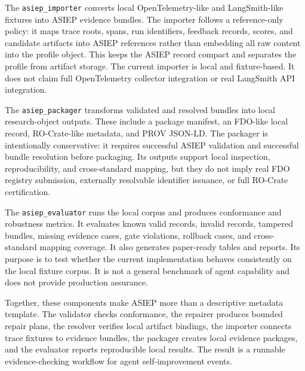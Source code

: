The \texttt{asiep\_importer} converts local OpenTelemetry-like and LangSmith-like fixtures into ASIEP evidence bundles. The importer follows a reference-only policy: it maps trace roots, spans, run identifiers, feedback records, scores, and candidate artifacts into ASIEP references rather than embedding all raw content into the profile object. This keeps the ASIEP record compact and separates the profile from artifact storage. The current importer is local and fixture-based. It does not claim full OpenTelemetry collector integration or real LangSmith API integration.

The \texttt{asiep\_packager} transforms validated and resolved bundles into local research-object outputs. These include a package manifest, an FDO-like local record, RO-Crate-like metadata, and PROV JSON-LD. The packager is intentionally conservative: it requires successful ASIEP validation and successful bundle resolution before packaging. Its outputs support local inspection, reproducibility, and cross-standard mapping, but they do not imply real FDO registry submission, externally resolvable identifier issuance, or full RO-Crate certification.

The \texttt{asiep\_evaluator} runs the local corpus and produces conformance and robustness metrics. It evaluates known valid records, invalid records, tampered bundles, missing evidence cases, gate violations, rollback cases, and cross-standard mapping coverage. It also generates paper-ready tables and reports. Its purpose is to test whether the current implementation behaves consistently on the local fixture corpus. It is not a general benchmark of agent capability and does not provide production assurance.

Together, these components make ASIEP more than a descriptive metadata template. The validator checks conformance, the repairer produces bounded repair plans, the resolver verifies local artifact bindings, the importer connects trace fixtures to evidence bundles, the packager creates local evidence packages, and the evaluator reports reproducible local results. The result is a runnable evidence-checking workflow for agent self-improvement events.
